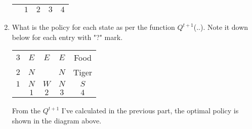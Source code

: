 \begin{enumerate}
\begin{center}
\begin{tabular}{|c|c|c|c|c|}
            \hline
                & $1$ & $2$                  & $3$        & $4$       \\
            \hline
          \end{tabular}
          \egroup
        \end{center}
  \item What is the policy for each state as per the function $Q^{t+1}$(..). Note it down below for each entry with "?" mark.
        \begin{center}
          \bgroup
          \def\arraystretch{1.5}%
          \begin{tabular}{|c|c|c|c|c|}
            \hline
            $3$ & $E$ & $E$                  & $E$ & Food  \\
            $2$ & $N$ & \cellcolor[gray]{.1} & $N$ & Tiger \\
            $1$ & $N$ & $W$                  & $N$ & $S$   \\
            \hline
                & $1$ & $2$                  & $3$ & $4$   \\
            \hline
          \end{tabular}
          \egroup
        \end{center}
        From the $Q^{t+1}$ I've calculated in the previous part, the optimal policy is shown in the diagram above.
\end{enumerate}